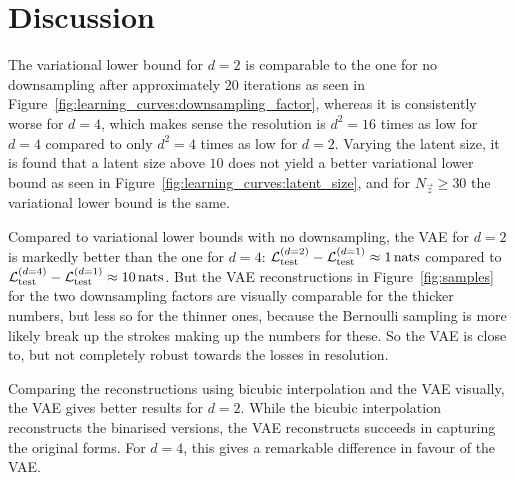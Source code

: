 \section{Discussion}
\label{sec:discussion}

The variational lower bound for $d = 2$ is comparable to the one for no downsampling after approximately $20$ iterations as seen in Figure~\ref{fig:learning_curves:downsampling_factor}, whereas it is consistently worse for $d = 4$, which makes sense the resolution is $d^2 = 16$ times as low for $d = 4$ compared to only $d^2 = 4$ times as low for $d = 2$.
Varying the latent size, it is found that a latent size above $10$ does not yield a better variational lower bound as seen in Figure~\ref{fig:learning_curves:latent_size}, and for $N_{\vec{z}} \geq 30$ the variational lower bound is the same.

Compared to variational lower bounds with no downsampling, the VAE for $d = 2$ is markedly better than the one for $d = 4$: $\mathcal{L}_{\text{test}}^{(d = 2)} - \mathcal{L}_{\text{test}}^{(d = 1)} \approx \SI{1}{nats}$ compared to $\mathcal{L}_{\text{test}}^{(d = 4)} - \mathcal{L}_{\text{test}}^{(d = 1)} \approx \SI{10}{nats}$.
But the VAE reconstructions in Figure~\ref{fig:samples} for the two downsampling factors are visually comparable for the thicker numbers, but less so for the thinner ones, because the Bernoulli sampling is more likely break up the strokes making up the numbers for these.
So the VAE is close to, but not completely robust towards the losses in resolution.

Comparing the reconstructions using bicubic interpolation and the VAE visually, the VAE gives better results for $d = 2$.
While the bicubic interpolation reconstructs the binarised versions, the VAE reconstructs succeeds in capturing the original forms.
For $d = 4$, this gives a remarkable difference in favour of the VAE.
